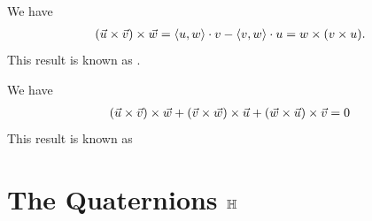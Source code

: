 \begin{proposition}
	We have 
	\begin{align*}
		(\vec{u} \times \vec{v}) \times \vec{w} = \left\langle u, w \right\rangle \cdot v - \left\langle v, w \right\rangle \cdot u = w \times (v \times u).
	\end{align*}
	This result is known as .
\end{proposition}
\begin{proposition}
	We have
	\begin{align*}
		(\vec{u} \times \vec{v}) \times \vec{w} + (\vec{v} \times \vec{w}) \times \vec{u} + (\vec{w} \times \vec{u}) \times \vec{v} = 0
	\end{align*}
	This result is known as 
\end{proposition}
\clearpage

\section{The Quaternions $\mathbb{H}$}
